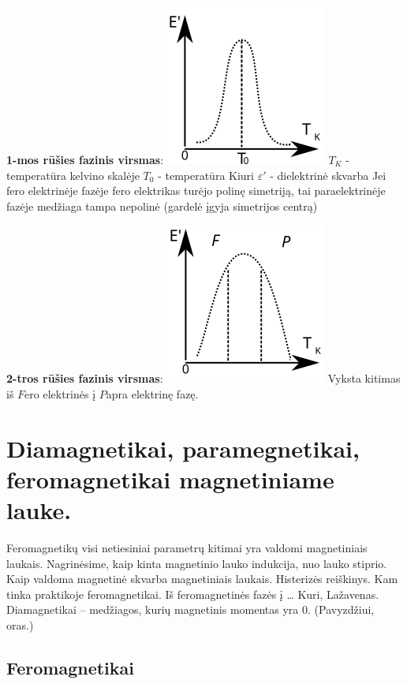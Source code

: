 \textbf{1-mos rūšies fazinis virsmas}:
\includegraphics[scale=1]{fero1.svg}
$T_K$ - temperatūra kelvino skalėje
$T_0$ - temperatūra Kiuri
$\varepsilon'$ - dielektrinė skvarba
Jei fero elektrinėje fazėje fero elektrikas turėjo polinę simetriją,
tai paraelektrinėje fazėje medžiaga tampa nepolinė
(gardelė įgyja simetrijos centrą)

\textbf{2-tros rūšies fazinis virsmas}:
\includegraphics[scale=1]{fero2.svg}
Vyksta kitimas iš $F$ero elektrinės į $P$apra elektrinę fazę.

\section{Diamagnetikai, paramegnetikai, feromagnetikai magnetiniame lauke.}
Feromagnetikų visi netiesiniai parametrų kitimai yra valdomi magnetiniais
laukais. Nagrinėsime, kaip kinta magnetinio lauko indukcija, nuo
lauko stiprio. Kaip valdoma magnetinė skvarba magnetiniais laukais.
Histerizės reiškinys. Kam tinka praktikoje feromagnetikai. Iš
feromagnetinės fazės į … Kuri, Lažavenas. Diamagnetikai – medžiagos, kurių
magnetinis momentas yra 0. (Pavyzdžiui, oras.)


\subsection{Feromagnetikai}

